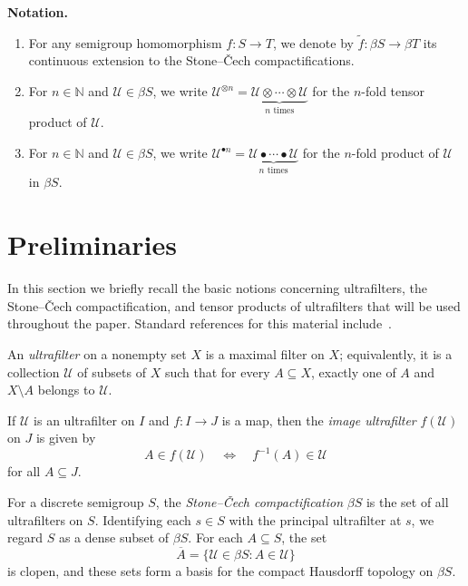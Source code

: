\documentclass[12pt]{amsart}
\begin{document}
\vspace{0.5cm}
\noindent\textbf{Notation.}
\begin{enumerate} 
    \item For any semigroup homomorphism $f\colon S\to T$, we denote by
    $\widetilde{f}\colon \beta S\to \beta T$
    its continuous extension to the Stone--Čech compactifications.

    \item For $n\in \mathbb{N}$ and $\mathcal{U}\in \beta S$, we write
    \(
    \mathcal{U}^{\otimes n}
    =
    \underbrace{\mathcal{U}\otimes \cdots \otimes \mathcal{U}}_{n\text{ times}}
    \)
    for the $n$-fold tensor product of $\mathcal{U}$.

    \item For $n\in \mathbb{N}$ and $\mathcal{U}\in \beta S$, we write
    \(
    \mathcal{U}^{\bullet n}
    =
    \underbrace{\mathcal{U}\bullet \cdots \bullet \mathcal{U}}_{n\text{ times}}
    \)
    for the $n$-fold product of $\mathcal{U}$ in $\beta S$.
\end{enumerate}

\section{Preliminaries}

In this section we briefly recall the basic notions concerning ultrafilters, the Stone--\v{C}ech compactification, and tensor products of ultrafilters that will be used throughout the paper. Standard references for this material include~\cite{HindmanStrauss}.


An \emph{ultrafilter} on a nonempty set $X$ is a maximal filter on $X$; equivalently, it is a collection $\mathcal U$ of subsets of $X$ such that for every $A\subseteq X$, exactly one of $A$ and $X\setminus A$ belongs to $\mathcal U$. 

If $\mathcal U$ is an ultrafilter on $I$ and $f:I\to J$ is a map, then the \emph{image ultrafilter} $f(\mathcal U)$ on $J$ is given by
\[
A\in f(\mathcal U)\quad\Longleftrightarrow\quad f^{-1}(A)\in\mathcal U
\]
for all $A\subseteq J$.

For a discrete semigroup $S$, the \emph{Stone--\v{C}ech compactification} $\beta S$ is the set of all ultrafilters on $S$. Identifying each $s\in S$ with the principal ultrafilter at $s$, we regard $S$ as a dense subset of $\beta S$. For each $A\subseteq S$, the set
\[
\overline{A}=\{\mathcal U\in\beta S:A\in\mathcal U\}
\]
is clopen, and these sets form a basis for the compact Hausdorff topology on $\beta S$.
\end{document}
